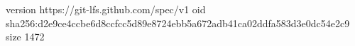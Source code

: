 version https://git-lfs.github.com/spec/v1
oid sha256:d2e9ce4ccbe6d8ccfcc5d89e8724ebb5a672adb41ca02ddfa583d3e0dc54e2c9
size 1472
